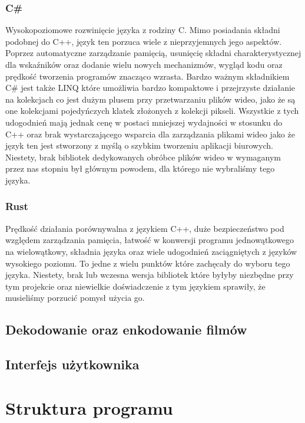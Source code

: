 \documentclass[twoside]{projektInzynierskiMS}
\begin{document}
\subsubsection{C\#}
Wysokopoziomowe rozwinięcie języka z rodziny C. Mimo posiadania składni podobnej do C++, język ten porzuca wiele z nieprzyjemnych jego aspektów. Poprzez automatyczne zarządzanie pamięcią, usunięcię składni charakterystycznej dla wskaźników oraz dodanie wielu nowych mechanizmów, wygląd kodu oraz prędkość tworzenia programów znacząco wzrasta. Bardzo ważnym składnikiem C\# jest także LINQ które umożliwia bardzo kompaktowe i przejrzyste działanie na kolekcjach co jest dużym plusem przy przetwarzaniu plików wideo, jako że są one kolekcjami pojedyńczych klatek złożonych z kolekcji pikseli. Wszystkie z tych udogodnień mają jednak cenę w postaci mniejszej wydajności w stosunku do C++ oraz brak wystarczającego wsparcia dla zarządzania plikami wideo jako że język ten jest stworzony z myślą o szybkim tworzeniu aplikacji biurowych. Niestety, brak bibliotek dedykowanych obróbce plików wideo w wymaganym przez nas stopniu był głównym powodem, dla którego nie wybraliśmy tego języka.

\subsubsection{Rust}
Prędkość działania porównywalna z językiem C++, duże bezpieczeństwo pod względem zarządzania pamięcia, łatwość w konwersji programu jednowątkowego na wielowątkowy, składnia języka oraz wiele udogodnień zaciągniętych z języków wysokiego poziomu. To jedne z wielu punktów które zachęcały do wyboru tego języka. Niestety, brak lub wczesna wersja bibliotek które byłyby niezbędne przy tym projekcie oraz niewielkie doświadczenie z tym językiem sprawiły, że musieliśmy porzucić pomysł użycia go.


\subsection{Dekodowanie oraz enkodowanie filmów}
\subsection{Interfejs użytkownika}


\section{Struktura programu}
\end{document}
